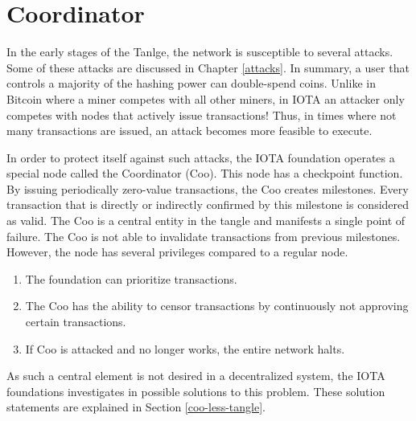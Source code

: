 \section{Coordinator}\label{coordinator}
In the early stages of the Tanlge, the network is susceptible to several attacks. Some of these attacks are discussed in Chapter \ref{attacks}. In summary, a user that controls a majority of the hashing power can double-spend coins. Unlike in Bitcoin where a miner competes with all other miners, in IOTA an attacker only competes with nodes that actively issue transactions! Thus, in times where not many transactions are issued, an attack becomes more feasible to execute.

In order to protect itself against such attacks, the IOTA foundation operates a special node called the Coordinator (Coo). This node has a checkpoint function. By issuing periodically zero-value transactions, the Coo creates milestones. Every transaction that is directly or indirectly confirmed by this milestone is considered as valid. The Coo is a central entity in the tangle and manifests a single point of failure. The Coo is not able to invalidate transactions from previous milestones. However, the node has several privileges compared to a regular node.

\begin{enumerate}
    \item The foundation can prioritize transactions.
    \item The Coo has the ability to censor transactions by continuously not approving certain transactions.
    \item If Coo is attacked and no longer works, the entire network halts.
\end{enumerate}

As such a central element is not desired in a decentralized system, the IOTA foundations investigates in possible solutions to this problem. These solution statements are explained in Section \ref{coo-less-tangle}.